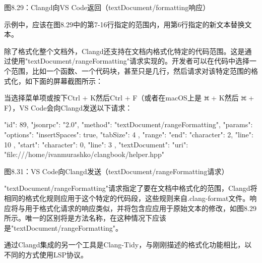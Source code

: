 \begin{center}
图8.29：Clangd向VS Code返回（textDocument/formatting响应）
\end{center}

示例中，应该在图8.29中的第7-16行指定的范围内，用第6行指定的新文本替换文本。


除了格式化整个文档外，Clangd还支持在文档内格式化特定的代码范围。这是通过使用"textDocument/rangeFormatting"请求实现的。开发者可以在代码中选择一个范围，比如一个函数、一个代码块，甚至只是几行，然后请求对该特定范围的格式化，如下面的屏幕截图所示：


当选择菜单项或按下Ctrl + K然后Ctrl + F（或者在macOS上是 \includegraphics[width=0.02\textwidth]{content/part2/chapter8/images/3.png} + K然后 \includegraphics[width=0.02\textwidth]{content/part2/chapter8/images/3.png} + F），VS Code会向Clangd发送以下请求：

\begin{shell}
{
  "id": 89,
  "jsonrpc": "2.0",
  "method": "textDocument/rangeFormatting",
  "params": {
    "options": {
      "insertSpaces": true,
      "tabSize": 4
    },
    "range": {
      "end": {
        "character": 2,
        "line": 10
      },
      "start": {
        "character": 0,
        "line": 3
      }
    },
    "textDocument": {
      "uri": "file:///home/ivanmurashko/clangbook/helper.hpp"
    }
  }
}
\end{shell}

\begin{center}
图8.31：VS Code向Clangd发送（textDocument/rangeFormatting请求）
\end{center}

"textDocument/rangeFormatting"请求指定了要在文档中格式化的范围，Clangd将相同的格式化规则应用于这个特定的代码段，这些规则来自.clang-format文件。响应将与用于格式化请求的响应类似，并将包含应应用于原始文本的修改，如图8.29所示。唯一的区别将是方法名称，在这种情况下应该是"textDocument/rangeFormatting"。

通过Clangd集成的另一个工具是Clang-Tidy，与刚刚描述的格式化功能相比，以不同的方式使用LSP协议。

